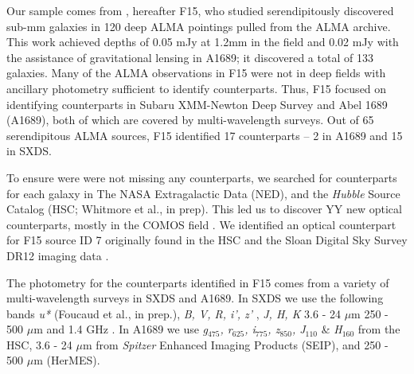 \documentclass[preprint,natbib209]{aastex}
\begin{document}
Our sample comes from \citet{fujimoto15}, hereafter F15, who studied serendipitously discovered sub-mm galaxies in 
120 deep ALMA pointings pulled from the ALMA archive. This work achieved depths of 0.05 mJy at 1.2mm in the field and 0.02 mJy 
with the assistance of gravitational lensing in A1689; it discovered a total of 133 galaxies. Many of the ALMA observations in F15 were not
in deep fields with ancillary photometry sufficient to identify counterparts. Thus, F15 focused on identifying counterparts in Subaru XMM-Newton Deep 
Survey \citep[SXDS;][]{furusawa08} and Abel 1689 (A1689), both of which are covered by multi-wavelength surveys. 
Out of 65 serendipitous ALMA sources, F15 identified 17 counterparts -- 2 in A1689 and 15 in SXDS. 

To ensure were were not missing any counterparts, we searched for counterparts for each galaxy in The NASA Extragalactic Data (NED), and
the \textit{Hubble} Source Catalog (HSC; Whitmore et al., in prep). This led us to discover YY new optical counterparts, 
mostly in the COMOS field \citep{COSMOS}. %
We identified an optical counterpart for F15 source ID 7 originally found in the HSC and the Sloan Digital Sky Survey \citep[SDSS;][]{york2000} 
DR12 \citep{alam15} imaging data \citep{fukugita96, gunn98, hogg01, smith02, pier03, ivezic04, gunn06, tucker06, padmanabhan08, doi10}.

The photometry for the counterparts identified in F15 comes from a variety of multi-wavelength surveys in SXDS and A1689.
In SXDS we use the following bands \textit{u*} (Foucaud et al., in prep.), \textit{B, V, R, i', z'} \citep{furusawa08},
\textit{J, H, K} \citep[UKIDSS;\footnotemark][]{lawrence07} 3.6 - 24 $\mu$m \citep[SWIRE, SpUDS, SEDS;][]{lonsdale03, ashby13}
250 - 500 $\mu$m \citep[HerMES;][]{oliver12, smith12, wang14} and 1.4 GHz \citep{simpson06}.
In A1689 we use \textit{g$_{475}$, r$_{625}$, i$_{775}$, z$_{850}$, J$_{110}$} \& \textit{H}$_{160}$ from the HSC,
 3.6 - 24 $\mu$m from \textit{Spitzer} Enhanced Imaging Products (SEIP), and 250 - 500 $\mu$m (HerMES).

\end{document}
